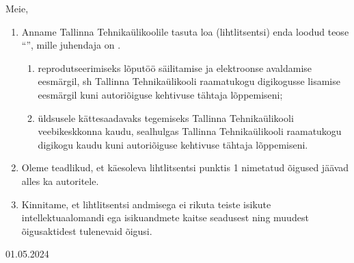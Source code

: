 Meie, \authorNames{}

\begin{enumerate}[label*=\arabic*.]
    \item Anname Tallinna Tehnikaülikoolile tasuta loa (lihtlitsentsi) enda loodud teose ``\thesisTitle{}'', mille juhendaja on \supervisorName{}.
    \begin{enumerate}[label*=\arabic*.]
        \item reprodutseerimiseks lõputöö säilitamise ja elektroonse avaldamise eesmärgil, sh Tallinna Tehnikaülikooli raamatukogu digikogusse lisamise eesmärgil kuni autoriõiguse kehtivuse tähtaja lõppemiseni;
        \item üldsusele kättesaadavaks tegemiseks Tallinna Tehnikaülikooli veebikeskkonna kaudu, sealhulgas Tallinna Tehnikaülikooli raamatukogu digikogu kaudu kuni autoriõiguse kehtivuse tähtaja lõppemiseni.
    \end{enumerate}
    \item Oleme teadlikud, et käesoleva lihtlitsentsi punktis 1 nimetatud õigused jäävad alles ka autoritele.
    \item Kinnitame, et lihtlitsentsi andmisega ei rikuta teiste isikute intellektuaalomandi ega isikuandmete kaitse seadusest ning muudest õigusaktidest tulenevaid õigusi.
\end{enumerate}

01.05.2024

